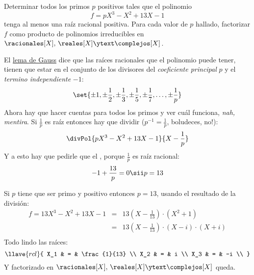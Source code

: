 \begin{enunciado}{\ejExtra}
  Determinar todos los primos $p$  positivos tales que el polinomio
  $$
    f = p X^3 - X^2 + 13X - 1
  $$
  tenga al menos una raíz racional positiva. Para cada valor de $p$ hallado, factorizar $f$ como producto de polinomios irreducibles en
  $\racionales[X],\,\reales[X] \ytext \complejos[X]$.
\end{enunciado}
El \hyperlink{teoria-7:lema-gauss}{lema de Gauss} dice que las raíces racionales que el polinomio puede tener, tienen que estar en el
conjunto de los divisores del \textit{coeficiente principal} $p$ y el \textit{termino independiente} $-1$:
$$
  \set{\pm 1,\pm \frac{1}{2},\pm \frac{1}{3},\pm \frac{1}{5},\pm \frac{1}{7}, \dots, \pm \frac{1}{p}}
$$
Ahora hay que hacer cuentas para todos los primos y ver cuál funciona, \textit{nah, mentira}.
Si $\frac{1}{p}$ es raíz entonces hay que dividir {\tiny ($p^{-1} = \frac{1}{p}$, boludeces, no!)}:
$$
  \divPol{pX^3 - X^2 + 13X -1}{X-\frac{1}{p}}
$$
Y a esto hay que pedirle que el , porque $\frac{1}{p}$ es raíz racional:
$$
  -1 + \frac{13}{p} = 0 \sii p = 13
$$

Si $p$ tiene que ser primo y positivo entonces $p = 13$, usando el resultado de la división:
$$
  \begin{array}{rcl}
    f = 13 X^3 - X^2 + 13 X - 1 & = & 13 (X - \frac{1}{13}) \cdot (X^2 + 1)             \\
                                & = & 13 (X - \frac{1}{13}) \cdot (X - i) \cdot (X + i) \\
  \end{array}
$$
Todo lindo las raíces:
$$
  \llave{rcl}{
    X_1 & = & \frac{1}{13} \\
    X_2 & = & i            \\
    X_3 & = & -i           \\
  }
$$
Y factorizado en $\racionales[X],\, \reales[X] \ytext \complejos[X]$ queda.
\begin{center}
\end{center}

\begin{aportes}
  \item {}
\end{aportes}

